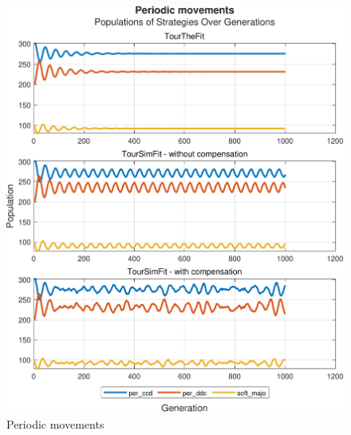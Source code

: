 \documentclass[12pt]{article}
\begin{document}
	\begin{figure}[h]
	      \centering
	      \includegraphics[scale=0.8]{Periodic movements.pdf}
	      \caption{Periodic movements}
	      \label{fig:Periodic movements}
	\end{figure}
\end{document}
